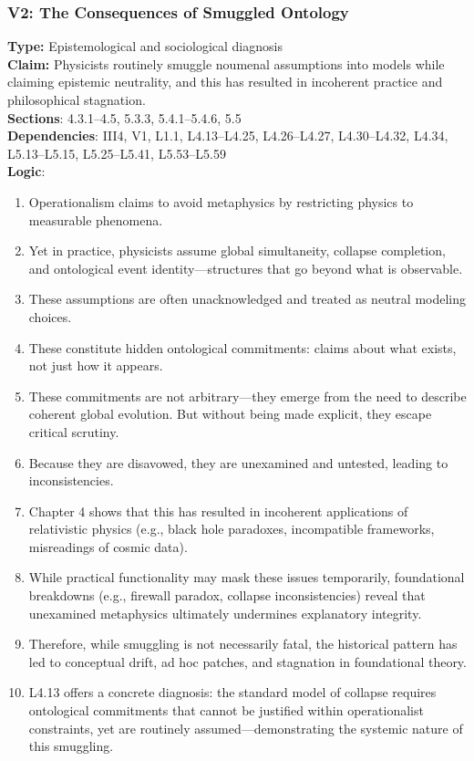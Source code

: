 \documentclass[12pt]{book}
\begin{document}
\subsubsection*{V2: The Consequences of Smuggled Ontology}
\label{appendix:V2}
\textbf{Type:} Epistemological and sociological diagnosis\\
\textbf{Claim:} Physicists routinely smuggle noumenal assumptions into models while claiming epistemic neutrality, and this has resulted in incoherent practice and philosophical stagnation.\\
\textbf{Sections}: 4.3.1–4.5, 5.3.3, 5.4.1–5.4.6, 5.5\\
\textbf{Dependencies}: III4, V1, L1.1, L4.13–L4.25, L4.26–L4.27, L4.30–L4.32, L4.34, L5.13–L5.15, L5.25–L5.41, L5.53–L5.59\\
\textbf{Logic}:
\begin{enumerate}
  \item Operationalism claims to avoid metaphysics by restricting physics to measurable phenomena.
  \item Yet in practice, physicists assume global simultaneity, collapse completion, and ontological event identity---structures that go beyond what is observable.
  \item These assumptions are often unacknowledged and treated as neutral modeling choices.
  \item These constitute hidden ontological commitments: claims about what exists, not just how it appears.
  \item These commitments are not arbitrary---they emerge from the need to describe coherent global evolution. But without being made explicit, they escape critical scrutiny.
  \item Because they are disavowed, they are unexamined and untested, leading to inconsistencies.
  \item Chapter 4 shows that this has resulted in incoherent applications of relativistic physics (e.g., black hole paradoxes, incompatible frameworks, misreadings of cosmic data).
  \item While practical functionality may mask these issues temporarily, foundational breakdowns (e.g., firewall paradox, collapse inconsistencies) reveal that unexamined metaphysics ultimately undermines explanatory integrity.
  \item Therefore, while smuggling is not necessarily fatal, the historical pattern has led to conceptual drift, ad hoc patches, and stagnation in foundational theory.
  \item L4.13 offers a concrete diagnosis: the standard model of collapse requires ontological commitments that cannot be justified within operationalist constraints, yet are routinely assumed---demonstrating the systemic nature of this smuggling.
\end{enumerate}
\end{document}
